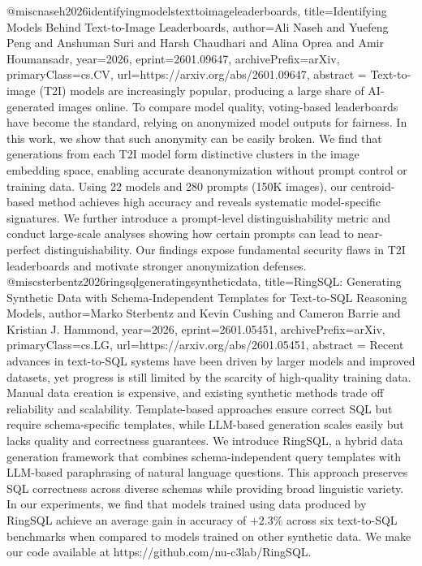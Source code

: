 {}@misc{naseh2026identifyingmodelstexttoimageleaderboards,
      title={Identifying Models Behind Text-to-Image Leaderboards}, 
      author={Ali Naseh and Yuefeng Peng and Anshuman Suri and Harsh Chaudhari and Alina Oprea and Amir Houmansadr},
      year={2026},
      eprint={2601.09647},
      archivePrefix={arXiv},
      primaryClass={cs.CV},
      url={https://arxiv.org/abs/2601.09647},
      abstract = {Text-to-image (T2I) models are increasingly popular, producing a large share of AI-generated images online. To compare model quality, voting-based leaderboards have become the standard, relying on anonymized model outputs for fairness. In this work, we show that such anonymity can be easily broken. We find that generations from each T2I model form distinctive clusters in the image embedding space, enabling accurate deanonymization without prompt control or training data. Using 22 models and 280 prompts (150K images), our centroid-based method achieves high accuracy and reveals systematic model-specific signatures. We further introduce a prompt-level distinguishability metric and conduct large-scale analyses showing how certain prompts can lead to near-perfect distinguishability. Our findings expose fundamental security flaws in T2I leaderboards and motivate stronger anonymization defenses.}
}@misc{sterbentz2026ringsqlgeneratingsyntheticdata,
      title={RingSQL: Generating Synthetic Data with Schema-Independent Templates for Text-to-SQL Reasoning Models}, 
      author={Marko Sterbentz and Kevin Cushing and Cameron Barrie and Kristian J. Hammond},
      year={2026},
      eprint={2601.05451},
      archivePrefix={arXiv},
      primaryClass={cs.LG},
      url={https://arxiv.org/abs/2601.05451},
      abstract = {Recent advances in text-to-SQL systems have been driven by larger models and improved datasets, yet progress is still limited by the scarcity of high-quality training data. Manual data creation is expensive, and existing synthetic methods trade off reliability and scalability. Template-based approaches ensure correct SQL but require schema-specific templates, while LLM-based generation scales easily but lacks quality and correctness guarantees. We introduce RingSQL, a hybrid data generation framework that combines schema-independent query templates with LLM-based paraphrasing of natural language questions. This approach preserves SQL correctness across diverse schemas while providing broad linguistic variety. In our experiments, we find that models trained using data produced by RingSQL achieve an average gain in accuracy of +2.3\% across six text-to-SQL benchmarks when compared to models trained on other synthetic data. We make our code available at https://github.com/nu-c3lab/RingSQL.}
}
